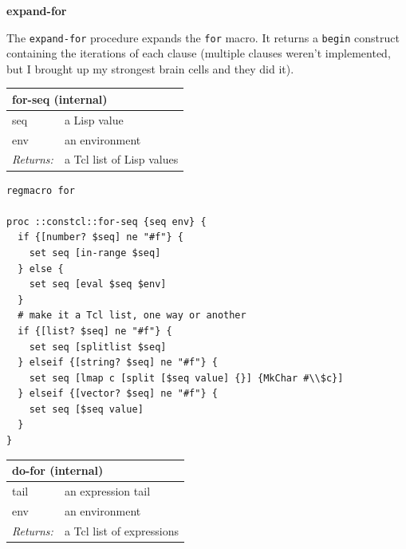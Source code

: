 \documentclass[twoside,9pt]{report}
\begin{document}
\textbf{expand-for}


The \texttt{expand-for} procedure expands the \texttt{for} macro. It returns a \texttt{begin} construct containing the iterations of each clause (multiple clauses weren't implemented, but I brought up my strongest brain cells and they did it).

\begin{tabular}{ |l l| }
\hline
\multicolumn{2}{|l|}{for-seq (internal)} \\
\hline
seq & a Lisp value \\
env & an environment \\
\textit{Returns:} & a Tcl list of Lisp values \\
\hline
\end{tabular}

\noindent\makebox[\linewidth]{\rule{\linewidth}{0.4pt}}
\begin{lstlisting}
regmacro for
 
proc ::constcl::for-seq {seq env} {
  if {[number? $seq] ne "#f"} {
    set seq [in-range $seq]
  } else {
    set seq [eval $seq $env]
  }
  # make it a Tcl list, one way or another
  if {[list? $seq] ne "#f"} {
    set seq [splitlist $seq]
  } elseif {[string? $seq] ne "#f"} { 
    set seq [lmap c [split [$seq value] {}] {MkChar #\\$c}]
  } elseif {[vector? $seq] ne "#f"} {
    set seq [$seq value]
  }
}
\end{lstlisting}
\noindent\makebox[\linewidth]{\rule{\linewidth}{0.4pt}}
\begin{tabular}{ |l l| }
\hline
\multicolumn{2}{|l|}{do-for (internal)} \\
\hline
tail & an expression tail \\
env & an environment \\
\textit{Returns:} & a Tcl list of expressions \\
\hline
\end{tabular}
\end{document}
